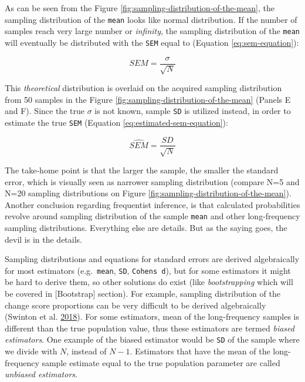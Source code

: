 \documentclass[
]{book}
\begin{document}
As can be seen from the Figure \ref{fig:sampling-distribution-of-the-mean}, the sampling distribution of the \texttt{mean} looks like normal distribution. If the number of samples reach very large number or \emph{infinity}, the sampling distribution of the \texttt{mean} will eventually be distributed with the \texttt{SEM} equal to (Equation \eqref{eq:sem-equation}):

\begin{equation}
  SEM = \frac{\sigma}{\sqrt{N}}
  \label{eq:sem-equation}
\end{equation}

This \emph{theoretical} distribution is overlaid on the acquired sampling distribution from 50 samples in the Figure \ref{fig:sampling-distribution-of-the-mean} (Panels E and F). Since the true \(\sigma\) is not known, sample \texttt{SD} is utilized instead, in order to estimate the true \texttt{SEM} (Equation \eqref{eq:estimated-sem-equation}):

\begin{equation}
  \hat{SEM} = \frac{SD}{\sqrt{N}}
  \label{eq:estimated-sem-equation}
\end{equation}

The take-home point is that the larger the sample, the smaller the standard error, which is visually seen as narrower sampling distribution (compare N=5 and N=20 sampling distributions on Figure \ref{fig:sampling-distribution-of-the-mean}). Another conclusion regarding frequentist inference, is that calculated probabilities revolve around sampling distribution of the sample \texttt{mean} and other long-frequency sampling distributions. Everything else are details. But as the saying goes, the devil is in the details.

Sampling distributions and equations for standard errors are derived algebraically for most estimators (e.g.~\texttt{mean}, \texttt{SD}, \texttt{Cohen\textquotesingle{}s\ d}), but for some estimators it might be hard to derive them, so other solutions do exist (like \emph{bootstrapping} which will be covered in {[}Bootstrap{]} section). For example, sampling distribution of the change score proportions can be very difficult to be derived algebraically (Swinton et al. \protect\hyperlink{ref-swintonStatisticalFrameworkInterpret2018}{2018}). For some estimators, mean of the long-frequency samples is different than the true population value, thus these estimators are termed \emph{biased estimators}. One example of the biased estimator would be \texttt{SD} of the sample where we divide with \(N\), instead of \(N-1\). Estimators that have the mean of the long-frequency sample estimate equal to the true population parameter are called \emph{unbiased estimators}.
\end{document}
